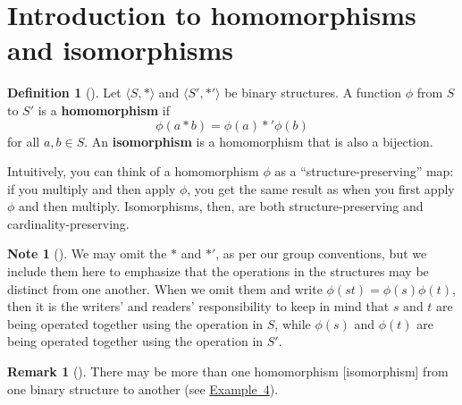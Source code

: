 \documentclass[10pt,]{book}
\newcommand{\terminology}[1]{\textbf{#1}}
\theoremstyle{plain}
\theoremstyle{definition}
\newtheorem{definition}[theorem]{Definition}
\theoremstyle{definition}
\newtheorem{remark}[theorem]{Remark}
\newtheorem{note}[theorem]{Note}
\theoremstyle{definition}
\theoremstyle{definition}
\numberwithin{equation}{section}
\begin{document}
\section[{Introduction to homomorphisms and isomorphisms}]{Introduction to homomorphisms and isomorphisms}\label{section-11}
\begin{definition}[{}]\label{definition-32}
Let \(\langle S,*\rangle\) and \(\langle S',*'\rangle\) be binary structures. A function \(\phi\) from \(S\) to \(S'\) is a \terminology{homomorphism} if%
\begin{equation*}
\phi(a* b)=\phi(a)*'\phi(b)
\end{equation*}
for all \(a,b\in S\). An \terminology{isomorphism} is a homomorphism that is also a bijection.%
\end{definition}
Intuitively, you can think of a homomorphism \(\phi\) as a ``structure-preserving'' map: if you multiply and then apply \(\phi\), you get the same result as when you first apply \(\phi\) and then multiply. Isomorphisms, then, are both structure-preserving and cardinality-preserving.%
\begin{note}[]\label{note-6}
We may omit the \(*\) and \(*'\), as per our group conventions, but we include them here to emphasize that the operations in the structures may be distinct from one another. When we omit them and write \(\phi(st)=\phi(s)\phi(t)\), then it is the writers' and readers' responsibility to keep in mind that \(s\) and \(t\) are being operated together using the operation in \(S\), while \(\phi(s)\) and \(\phi(t)\) are being operated together using the operation in \(S'\).%
\end{note}
\begin{remark}[]\label{remark-16}
There may be more than one homomorphism [isomorphism] from one binary structure to another (see \hyperref[homos]{Example~4}).%
\end{remark}
\end{document}
